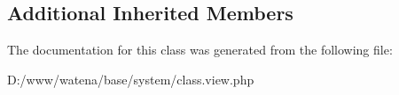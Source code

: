 \subsection*{Additional Inherited Members}


The documentation for this class was generated from the following file\-:\begin{DoxyCompactItemize}
\item 
D\-:/www/watena/base/system/class.\-view.\-php\end{DoxyCompactItemize}
